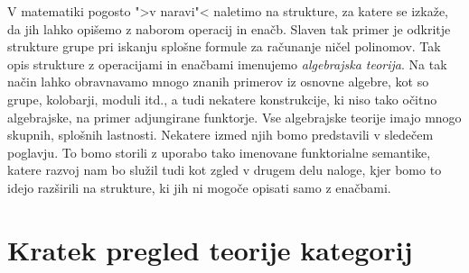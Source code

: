 \documentclass[../kategoricna_logika.tex]{subfiles}
\begin{document}
V matematiki pogosto ">v naravi"< naletimo na strukture, za katere se izkaže,
da jih lahko opišemo z naborom operacij in enačb.
Slaven tak primer je odkritje strukture grupe pri iskanju splošne formule
za računanje ničel polinomov.
Tak opis strukture z operacijami in enačbami imenujemo \emph{algebrajska teorija}.
Na tak način lahko obravnavamo mnogo znanih primerov iz osnovne algebre,
kot so grupe, kolobarji, moduli itd., a tudi nekatere konstrukcije, ki niso
tako očitno algebrajske, na primer adjungirane funktorje.
Vse algebrajske teorije imajo mnogo skupnih, splošnih lastnosti.
Nekatere izmed njih bomo predstavili v sledečem poglavju.
To bomo storili z uporabo tako imenovane funktorialne semantike, katere
razvoj nam bo služil tudi kot zgled v drugem delu naloge, kjer bomo to
idejo razširili na strukture, ki jih ni mogoče opisati samo z enačbami.
\section{Kratek pregled teorije kategorij}
\end{document}
